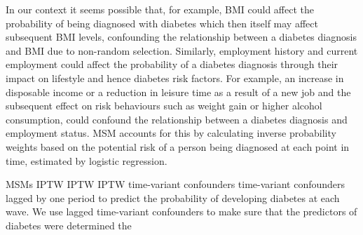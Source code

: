 In our context it seems possible that, for example, \ac{BMI} could affect the probability of being diagnosed with diabetes which then itself may affect subsequent \ac{BMI} levels, confounding the relationship between a diabetes diagnosis and \ac{BMI} due to non-random selection. Similarly, employment history and current employment could affect the probability of a diabetes diagnosis through their impact on lifestyle and hence diabetes risk factors. For example, an increase in disposable income or a reduction in leisure time as a result of a new job and the subsequent effect on risk behaviours \DIFdelbegin {}\DIFdelend such as weight gain or higher alcohol consumption, could confound the relationship between a diabetes diagnosis and employment status. \ac{MSM} accounts for this by calculating inverse probability weights based on the potential risk of a person being diagnosed at each point in time, estimated by logistic regression. 

\DIFdelbegin {}\DIFdelend \DIFaddbegin {}\acp{MSM}\textit{} \ac{IPTW} \ac{IPTW} \parencite{Cole2008}\textit{} \ac{IPTW} \DIFaddend time-variant confounders \DIFdelbegin {}\DIFdelend \DIFaddbegin {}\DIFaddend time-variant confounders lagged by one period \DIFaddbegin {}\DIFaddend to predict the \DIFaddbegin {}\DIFaddend probability of developing diabetes at each wave. We use lagged time-variant confounders to make sure that the predictors of diabetes were determined \DIFdelbegin {}\DIFdelend \DIFaddbegin {}\DIFaddend the \DIFdelbegin {}\DIFdelend \DIFaddbegin {}

